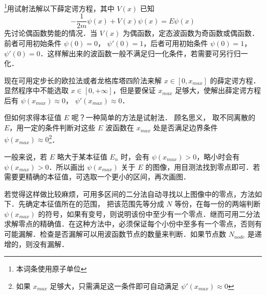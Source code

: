 

\footnote{本词条使用原子单位}用试射法解以下薛定谔方程，其中 $V(x)$ 已知
\begin{equation}
-\frac{1}{2m}\psi(x) + V(x)\psi(x) = E \psi(x)
\end{equation}
先讨论偶函数势能的情况．当 $V(x)$ 为偶函数，定态波函数为奇函数或偶函数．前者可用初始条件 $\psi(0)=0$， $\psi'(0)=1$，后者可用初始条件 $\psi(0)=1$， $\psi'(0)=0$．这样解出来的波函数一般不满足归一化条件，若需要可另行归一化．

现在可用定步长的欧拉法或者龙格库塔四阶法来解 $x\in [0, x_{max}]$ 的薛定谔方程．显然程序中不能选取 $x\in [0,+\infty]$，但是要保证 $x_{max}$ 足够大，使解出薛定谔方程后有 $\psi(x_{max})\approx 0$， $\psi'(x_{max})\approx 0$．

但如何求得本征值 $E$ 呢？一种简单的方法是试射法． 顾名思义， 取不同离散的 $E$，用一定的条件判断对这些 $E$ 波函数在 $x_{max}$ 处是否满足边界条件 $\psi(x_{max}) \approx 0$\footnote{如果 $x_{max}$ 足够大，只需满足这一条件即可自动满足 $\psi'(x_{max})\approx 0$}．

一般来说，若 $E$ 略大于某本征值 $E_n$ 时，会有 $\psi(x_{max})>0$，略小时会有 $\psi(x_{max})>0$．所以画出 $\psi(x_{max})$ 关于 $E$ 的图像，用目测法找到零点即可．若需要更精确的本征值，可选取一个更小的区间，再次画图．

若觉得这样做比较麻烦，可用多区间的二分法自动寻找以上图像中的零点，方法如下．先确定本征值所在的范围， 把该范围先等分成 $N$ 等份，在每一份的两端判断 $\psi(x_{max})$ 的符号，如果有变号，则说明该份中至少有一个零点．继而可用二分法求解零点的精确值．在这种方法中，必须保证每个小份中至多有一个零点，否则有可能漏解．检查是否漏解可以用波函数节点的数量来判断．如果节点数 $N_{node}$ 是递增的，则没有漏解．
